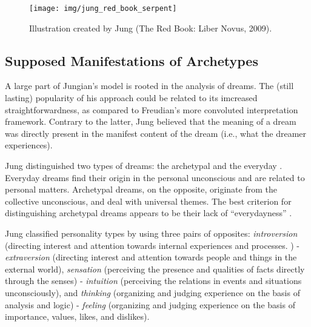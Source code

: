 \documentclass[
]{book}
\begin{document}
\begin{figure}

{\centering \texttt{[image: img/jung\_red\_book\_serpent]} 

}

\caption{Illustration created by Jung (The Red Book: Liber Novus, 2009).}\label{fig:unnamed-chunk-8}
\end{figure}

\hypertarget{supposed-manifestations-of-archetypes}{%
\subsection{Supposed Manifestations of Archetypes}\label{supposed-manifestations-of-archetypes}}

A large part of Jungian's model is rooted in the analysis of dreams. The (still lasting) popularity of his approach could be related to its imcreased straightforwardness, as compared to Freudian's more convoluted interpretation framework. Contrary to the latter, Jung believed that the meaning of a dream was directly present in the manifest content of the dream (i.e., what the dreamer experiences).

Jung distinguished two types of dreams: the archetypal and the everyday \citep{cann1986jungian}. Everyday dreams find their origin in the personal unconscious and are related to personal matters. Archetypal dreams, on the opposite, originate from the collective unconscious, and deal with universal themes. The best criterion for distinguishing archetypal dreams appears to be their lack of ``everydayness'' \citep{kluger1975archetypal, cann1986jungian}.

Jung classified personality types by using three pairs of opposites: \emph{introversion} (directing interest and attention towards internal experiences and processes. ) - \emph{extraversion} (directing interest and attention towards people and things in the external world), \emph{sensation} (perceiving the presence and qualities of facts directly through the senses) - \emph{intuition} (perceiving the relations in events and situations unconsciously), and \emph{thinking} (organizing and judging experience on the basis of analysis and logic) - \emph{feeling} (organizing and judging experience on the basis of importance, values, likes, and dislikes).
\end{document}
